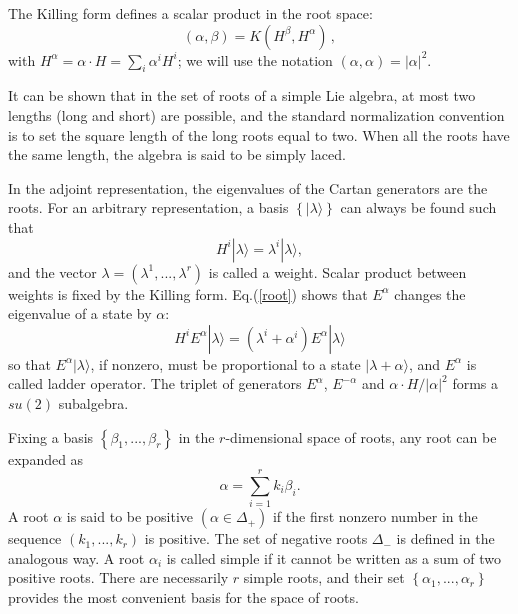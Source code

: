 \documentclass[a4paper,12pt]{report}
\begin{document}
The Killing form defines a scalar product in the root space:
\begin{equation}
\left(\alpha,\beta\right)=K\left(H^{\beta},H^{\alpha}\right)\,,
\end{equation}
with $H^{\alpha}=\alpha\cdot H=\sum_{i}\alpha^{i}H^{i}$; we will use the notation
$\left(\alpha,\alpha\right)=|\alpha|^{2}$.

It can be shown that in the set of roots of a simple Lie algebra, at most two lengths (long and short) are
possible, and the standard normalization convention is to set the square length of the long roots equal to two.
When all the roots have the same length, the algebra is said to be simply laced.

In the adjoint representation, the eigenvalues of the Cartan generators are the roots. For an arbitrary
representation, a basis $\left\{|\lambda\rangle\right\}$ can always be found such that
\begin{equation}
H^{i}|\lambda\rangle=\lambda^{i}|\lambda\rangle,
\end{equation}
and the vector $\lambda=\left(\lambda^{1},...,\lambda^{r}\right)$ is called a weight. Scalar product between
weights is fixed by the Killing form. Eq.(\ref{root}) shows that $E^{\alpha}$ changes the eigenvalue of a state
by $\alpha$:
\begin{equation}
H^{i}E^{\alpha}|\lambda\rangle=\left(\lambda^{i}+\alpha^{i}\right)E^{\alpha}|\lambda\rangle
\end{equation}
so that $E^{\alpha}|\lambda\rangle$, if nonzero, must be proportional to a state $|\lambda+\alpha\rangle$, and
$E^{\alpha}$ is called ladder operator. The triplet of generators $E^{\alpha}$, $E^{-\alpha}$ and $\alpha\cdot
H/|\alpha|^{2}$ forms a $su(2)$ subalgebra.

Fixing a basis $\left\{\beta_{1},...,\beta_{r}\right\}$ in the $r$-dimensional space of roots, any root can be
expanded as
\begin{equation}
\alpha=\sum_{i=1}^{r}k_{i}\beta_{i}.
\end{equation}
A root $\alpha$ is said to be positive $\left(\alpha\in\Delta_{+}\right)$ if the first nonzero number in the
sequence $\left(k_{1},...,k_{r}\right)$ is positive. The set of negative roots $\Delta_{-}$ is defined in the
analogous way. A root $\alpha_{i}$ is called simple if it cannot be written as a sum of two positive roots. There
are necessarily $r$ simple roots, and their set $\left\{\alpha_{1},...,\alpha_{r}\right\}$ provides the most
convenient basis for the space of roots.
\end{document}
